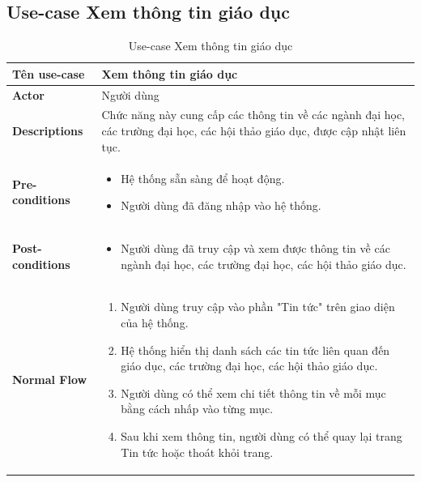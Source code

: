\subsection{Use-case Xem thông tin giáo dục}
    \begin{longtable}[H]{|l|p{}|}
        \caption{Use-case Xem thông tin giáo dục}
        \\ \hline
        \textbf{Tên use-case} & Xem thông tin giáo dục \\
        \hline
        \textbf{Actor} & Người dùng \\
        \hline
        \textbf{Descriptions} & Chức năng này cung cấp các thông tin về các ngành đại học, các trường đại học, các hội thảo giáo dục, được cập nhật liên tục. \\
        \hline
        \textbf{Pre-conditions} & \vspace{-1cm} \begin{itemize}[leftmargin=4mm]
            \setlength\itemsep{0em}
            \item Hệ thống sẵn sàng để hoạt động.
            \item Người dùng đã đăng nhập vào hệ thống.
        \end{itemize} \\
        
        \hline

        \textbf{Post-conditions} & \vspace{-1cm} \begin{itemize}[leftmargin=4mm]
            \setlength\itemsep{0em}
            \item Người dùng đã truy cập và xem được thông tin về các ngành đại học, các trường đại học, các hội thảo giáo dục.
        \end{itemize} \\
            
        \hline
        
        \textbf{Normal Flow} & \vspace{-1cm} 
                \begin{enumerate}[leftmargin=5.5mm]
                    \setlength\itemsep{0em}
                    \item Người dùng truy cập vào phần "Tin tức" trên giao diện của hệ thống.
                    \item Hệ thống hiển thị danh sách các tin tức liên quan đến giáo dục, các trường đại học, các hội thảo giáo dục.
                    \item Người dùng có thể xem chi tiết thông tin về mỗi mục bằng cách nhấp vào từng mục.
                    \item Sau khi xem thông tin, người dùng có thể quay lại trang Tin tức hoặc thoát khỏi trang. 
                \end{enumerate}\\
                

\end{longtable}
